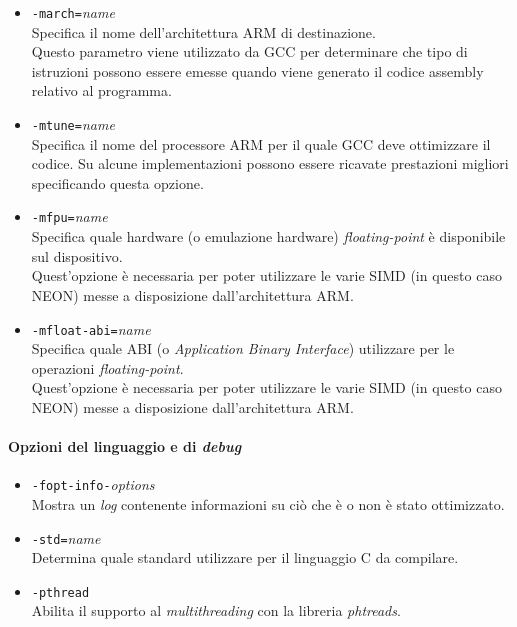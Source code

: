 \begin{itemize}
  
  \item \verb|-march=|\emph{name}\\
  Specifica il nome dell'architettura ARM di destinazione.\\
  Questo parametro viene utilizzato da GCC per determinare che tipo di 
  istruzioni possono essere emesse quando viene generato il codice assembly 
  relativo al programma.
  
  \item \verb|-mtune=|\emph{name}\\
  Specifica il nome del processore ARM per il quale GCC deve ottimizzare il 
  codice. Su alcune implementazioni possono essere ricavate prestazioni 
  migliori specificando questa opzione.
  
  \item \verb|-mfpu=|\emph{name}\\
  Specifica quale hardware (o emulazione hardware) \emph{floating-point} è 
  disponibile sul dispositivo.\\
  Quest'opzione è necessaria per poter utilizzare le varie SIMD (in 
  questo caso NEON) messe a disposizione dall'architettura ARM.
  
  \item \verb|-mfloat-abi=|\emph{name}\\
  Specifica quale ABI (o \emph{Application Binary Interface}) utilizzare per le 
  operazioni \emph{floating-point}. \\
  Quest'opzione è necessaria per poter utilizzare le varie SIMD (in 
  questo caso NEON) messe a disposizione dall'architettura ARM.
  
\end{itemize}

\paragraph{Opzioni del linguaggio e di \emph{debug}}

\begin{itemize}
  
  \item \verb|-fopt-info-|\emph{options}\\
  Mostra un \emph{log} contenente informazioni su ciò che è o non è stato 
  ottimizzato.
  
  \item \verb|-std=|\emph{name}\\
  Determina quale standard utilizzare per il linguaggio C da compilare.
  
  \item \verb|-pthread|\\
  Abilita il supporto al \emph{multithreading} con la libreria \emph{phtreads}.
  
\end{itemize}

